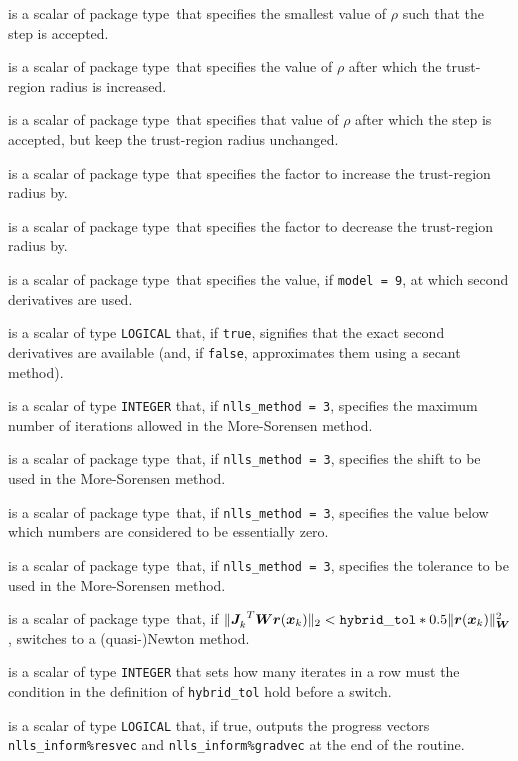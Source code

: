 \documentclass{spec}
\newcommand{\scalarinteger}{is a scalar of type {\tt INTEGER} }
\newcommand{\scalarlogical}{is a scalar of type {\tt LOGICAL} }
\newcommand{\scalarreal}{is a scalar of package type\ }
\begin{document}
\begin{description}
 \scalarreal that specifies the smallest value of $\rho$ such that the step is accepted.

 \scalarreal that specifies the value of $\rho$ after which the trust-region radius is increased.

 \scalarreal that specifies that value of $\rho$ after which the step is accepted,
but keep the trust-region radius unchanged.

 \scalarreal that specifies the factor to increase the trust-region radius by.

 \scalarreal that specifies the factor to decrease the trust-region radius by.

 \scalarreal that specifies the value, if {\tt model = 9},
at which second derivatives are used.

 \scalarlogical that, if {\tt true}, signifies that the
exact second derivatives are available (and, if {\tt false}, approximates them using a secant method).

 \scalarinteger that, if {\tt nlls\_method = 3}, specifies the maximum number of iterations allowed in the More-Sorensen method.

 \scalarreal that, if {\tt nlls\_method = 3}, specifies the shift to be used in the More-Sorensen method.

 \scalarreal that, if {\tt nlls\_method = 3}, specifies the value
below which numbers are considered to be essentially zero.

 \scalarreal that, if {\tt nlls\_method = 3}, specifies the tolerance
to be used in the More-Sorensen method.

 \scalarreal that, if \(\|{{\bm J}_{k}^{}}^T {\bm W} {\bm r}({\bm x}_k) \|_2 < \mathtt{hybrid\_tol} * 0.5 \|{\bm r}({\bm x}_k)\|_{\bm W}^2\), switches to a \newline(quasi-)Newton method.

 \scalarinteger that sets how many iterates in a row must
the condition in the definition of {\tt hybrid\_tol} hold before a switch.

 \scalarlogical that, if true, outputs the progress vectors {\tt nlls\_inform\%resvec} and {\tt nlls\_inform\%gradvec} at the end of the routine.

\end{description}
\end{document}
